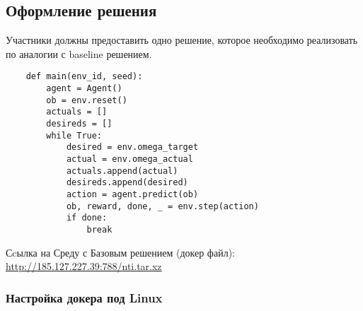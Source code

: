 \subsection*{Оформление решения}

Участники должны предоставить одно решение, которое необходимо реализовать по аналогии с baseline решением.

\begin{verbatim}
    def main(env_id, seed):
        agent = Agent()
        ob = env.reset()
        actuals = []
        desireds = []
        while True:
            desired = env.omega_target
            actual = env.omega_actual
            actuals.append(actual)
            desireds.append(desired)
            action = agent.predict(ob)
            ob, reward, done, _ = env.step(action)
            if done:
                break

\end{verbatim}

Сcылка на Среду с Базовым решением (докер файл): \url{http://185.127.227.39:788/nti.tar.xz}

\subsubsection*{Настройка докера под Linux}

